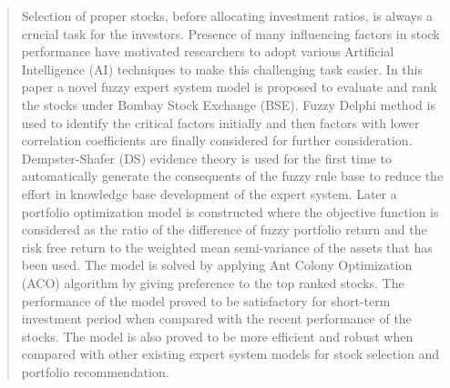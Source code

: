\documentclass{ws-ijufks}
\begin{document}
\begin{abstract}
Selection of proper stocks, before allocating investment ratios, is always a crucial task for the investors. Presence 
of many influencing factors in stock performance have motivated researchers to adopt various Artificial Intelligence 
(AI) techniques to make this challenging task easier. In this paper a novel fuzzy expert system model is proposed to 
evaluate and rank the stocks under Bombay Stock Exchange (BSE). Fuzzy Delphi method is used to identify the critical 
factors initially and then factors with lower correlation coefficients are finally considered for further 
consideration. Dempster-Shafer (DS) evidence theory is used for the first time to automatically generate the 
consequents of the fuzzy rule base to reduce the effort in knowledge base development of the expert system. Later a 
portfolio optimization model is constructed where the objective function is considered as the ratio of the difference 
of fuzzy portfolio return and the risk free return to the weighted mean semi-variance of the assets that has been used. 
The model is solved by applying Ant Colony Optimization (ACO) algorithm by giving preference to the top ranked stocks. 
The performance of the model proved to be satisfactory for short-term investment period when compared with the recent 
performance of the stocks. The model is also proved to be more efficient and robust when compared with other existing 
expert system models for stock selection and portfolio recommendation. 
\end{abstract}

\end{document}
